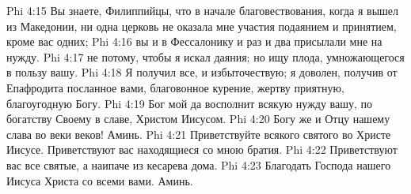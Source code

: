 \vs Phi 4:15 Вы знаете, Филиппийцы, что в начале благовествования, когда я вышел из Македонии, ни одна церковь не оказала мне участия подаянием и принятием, кроме вас одних;
\vs Phi 4:16 вы и в Фессалонику и раз и два присылали мне на нужду.
\vs Phi 4:17  не потому, чтобы я искал даяния; но ищу плода, умножающегося в пользу вашу.
\vs Phi 4:18 Я получил все, и избыточествую; я доволен, получив от Епафродита посланное вами,  благовонное курение, жертву приятную, благоугодную Богу.
\vs Phi 4:19 Бог мой да восполнит всякую нужду вашу, по богатству Своему в славе, Христом Иисусом.
\vs Phi 4:20 Богу же и Отцу нашему слава во веки веков! Аминь.
\rsbpar\vs Phi 4:21 Приветствуйте всякого святого во Христе Иисусе. Приветствуют вас находящиеся со мною братия.
\vs Phi 4:22 Приветствуют вас все святые, а наипаче из кесарева дома.
\rsbpar\vs Phi 4:23 Благодать Господа нашего Иисуса Христа со всеми вами. Аминь.
